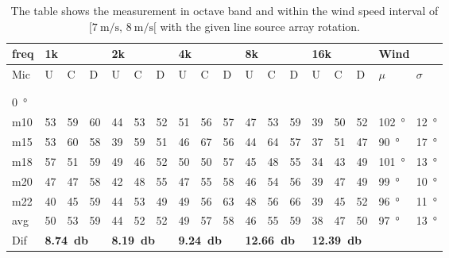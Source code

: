 \begin{table}[H]
\centering
\caption{The table shows the measurement in octave band and within the wind speed interval of $[\SI{7}{\meter\per\second},\, \SI{8}{\meter\per\second}[ $ with the given line source array rotation.}
\setlength\tabcolsep{5pt} %
\begin{tabular}{l|l|l|l|l|l|l|l|l|l|l|l|l|l|l|l|l|l}
freq & \multicolumn{3}{l|}{1k} & \multicolumn{3}{l|}{2k} & \multicolumn{3}{l|}{4k} & \multicolumn{3}{l|}{8k} & \multicolumn{3}{l|}{16k}   &  \multicolumn{2}{l}{Wind}                      \\ \hline
Mic  & U      & C      & D     & U      & C      & D     & U      & C      & D     & U      & C      & D     & U  & C  & D & $\mu$ & $\sigma$ \\ \hline
 & \multicolumn{3}{l|}{} & \multicolumn{3}{l|}{} & \multicolumn{3}{l|}{} & \multicolumn{3}{l|}{} & \multicolumn{3}{l|}{} &      \multicolumn{2}{l}{}                        \\ 
 \multicolumn{18}{l}{ } \\  
\SI{0}{\degree}   & \multicolumn{3}{l|}{} & \multicolumn{3}{l|}{} & \multicolumn{3}{l|}{} & \multicolumn{3}{l|}{} & \multicolumn{3}{l|}{} &  \multicolumn{2}{l}{}   \\  \hline
m10  & 53     & 59     & 60    & 44     & 53     & 52    & 51     & 56     & 57    & 47     & 53     & 59    & 39 & 50 & 52 & \SI{102}{\degree} & \SI{12}{\degree}  \\
m15  & 53     & 60     & 58    & 39     & 59     & 51    & 46     & 67     & 56    & 44     & 64     & 57    & 37 & 51 & 47 & \SI{90}{\degree} & \SI{17}{\degree}  \\
m18  & 57     & 51     & 59    & 49     & 46     & 52    & 50     & 50     & 57    & 45     & 48     & 55    & 34 & 43 & 49 & \SI{101}{\degree} & \SI{13}{\degree}  \\
m20  & 47     & 47     & 58    & 42     & 48     & 55    & 47     & 55     & 58    & 46     & 54     & 56    & 39 & 47 & 49 & \SI{99}{\degree} & \SI{10}{\degree}  \\
m22  & 40     & 45     & 59    & 44     & 53     & 49    & 49     & 56     & 63    & 48     & 56     & 66    & 39 & 45 & 52 & \SI{96}{\degree} & \SI{11}{\degree}  \\ \hline
avg  &  50     &  53   &  59    &  44    & 52     & 52    &  49    &  57    &  58   &  46    &  55    & 59    & 38   & 47   &  50  & \SI{97}{\degree} & \SI{13}{\degree} \\ \hline  
Dif & \multicolumn{3}{l|}{\textbf{\SI{8.74}{\decibel}}} & \multicolumn{3}{l|}{\textbf{\SI{8.19}{\decibel}}} & \multicolumn{3}{l|}{\textbf{\SI{9.24}{\decibel}}} & \multicolumn{3}{l|}{\textbf{\SI{12.66}{\decibel}}} &  \multicolumn{3}{l|}{\textbf{\SI{12.39}{\decibel}}} &  \multicolumn{2}{l}{}  \\ \hline 

\end{tabular}
\end{table}
